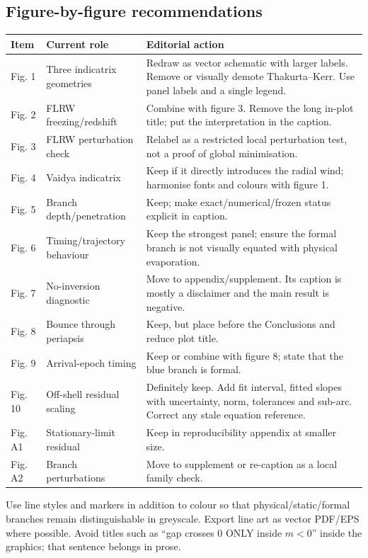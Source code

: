 \documentclass[11pt,a4paper]{article}
\begin{document}
\subsection{Figure-by-figure recommendations}

\begin{longtable}{@{}p{}p{}p{}@{}}
\toprule
Item & Current role & Editorial action \\
\midrule
\endhead
Fig. 1 & Three indicatrix geometries & Redraw as vector schematic with larger labels.  Remove or
visually demote Thakurta--Kerr.  Use panel labels and a single legend. \\
Fig. 2 & FLRW freezing/redshift & Combine with figure 3.  Remove the long in-plot title; put the
interpretation in the caption. \\
Fig. 3 & FLRW perturbation check & Relabel as a restricted local perturbation test, not a proof of
global minimisation. \\
Fig. 4 & Vaidya indicatrix & Keep if it directly introduces the radial wind; harmonise fonts and
colours with figure 1. \\
Fig. 5 & Branch depth/penetration & Keep; make exact/numerical/frozen status explicit in caption. \\
Fig. 6 & Timing/trajectory behaviour & Keep the strongest panel; ensure the formal branch is not
visually equated with physical evaporation. \\
Fig. 7 & No-inversion diagnostic & Move to appendix/supplement.  Its caption is mostly a disclaimer
and the main result is negative. \\
Fig. 8 & Bounce through periapsis & Keep, but place before the Conclusions and reduce plot title. \\
Fig. 9 & Arrival-epoch timing & Keep or combine with figure 8; state that the blue branch is formal. \\
Fig. 10 & Off-shell residual scaling & Definitely keep.  Add fit interval, fitted slopes with
uncertainty, norm, tolerances and sub-arc.  Correct any stale equation reference. \\
Fig. A1 & Stationary-limit residual & Keep in reproducibility appendix at smaller size. \\
Fig. A2 & Branch perturbations & Move to supplement or re-caption as a local family check. \\
\bottomrule
\end{longtable}

Use line styles and markers in addition to colour so that physical/static/formal branches remain
distinguishable in greyscale.  Export line art as vector PDF/EPS where possible.  Avoid titles such
as ``gap crosses 0 ONLY inside $m<0$'' inside the graphics; that sentence belongs in prose.
\end{document}
